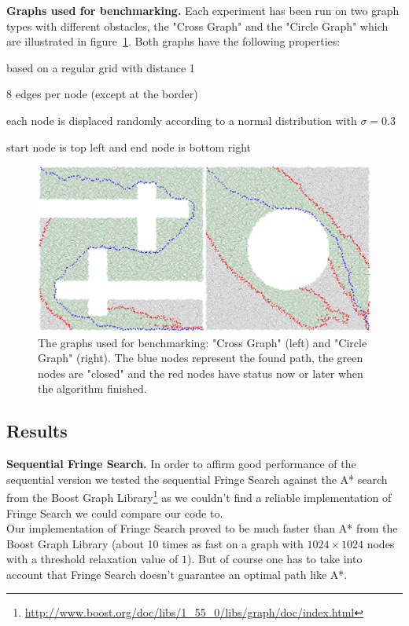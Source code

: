 \documentclass[letterpaper]{article}
\newcommand{\mypar}[1]{{\bf #1.}}
\begin{document}
\mypar{Graphs used for benchmarking}
Each experiment has been run on two graph types with different obstacles, the "Cross Graph" and the "Circle Graph" which are illustrated in figure~\ref{fig:graphs}. Both graphs have the following properties:
\begin{compactitem}
\item based on a regular grid with distance 1
\item 8 edges per node (except at the border)
\item each node is displaced randomly according to a normal distribution with $\sigma = 0.3$
\item start node is top left and end node is bottom right
\end{compactitem}

\begin{figure}[h]\centering
  \includegraphics[scale=0.3]{benchmark_graphs.eps}
  \caption{The graphs used for benchmarking: "Cross Graph" (left) and "Circle Graph" (right). The blue nodes represent the found path, the green nodes are "closed" and the red nodes have status now or later when the algorithm finished. \label{fig:graphs}}
\end{figure}

\subsection{Results}\label{ssec:results}

\mypar{Sequential Fringe Search}
In order to affirm good performance of the sequential version we tested the sequential Fringe Search against the A* search from the Boost Graph Library\footnote{\url{http://www.boost.org/doc/libs/1_55_0/libs/graph/doc/index.html}} as we couldn't find a reliable implementation of Fringe Search we could compare our code to.\\
Our implementation of Fringe Search proved to be much faster than A* from the Boost Graph Library (about 10 times as fast on a graph with $1024 \times 1024$ nodes with a threshold relaxation value of $1$). But of course one has to take into account that Fringe Search doesn't guarantee an optimal path like A*.
\end{document}
